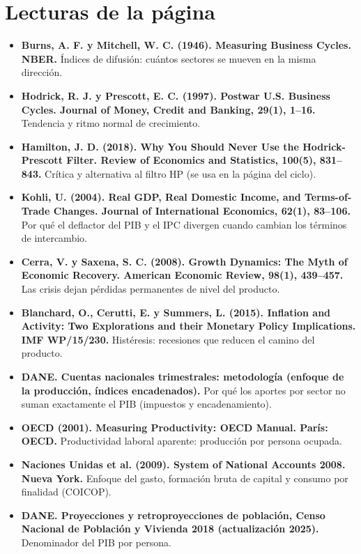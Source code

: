\section*{Lecturas de la página}
\begin{itemize}\small
\item \textbf{Burns, A. F. y Mitchell, W. C. (1946). Measuring Business Cycles. NBER.} Índices de difusión: cuántos sectores se mueven en la misma dirección.
\item \textbf{Hodrick, R. J. y Prescott, E. C. (1997). Postwar U.S. Business Cycles. Journal of Money, Credit and Banking, 29(1), 1–16.} Tendencia y ritmo normal de crecimiento.
\item \textbf{Hamilton, J. D. (2018). Why You Should Never Use the Hodrick-Prescott Filter. Review of Economics and Statistics, 100(5), 831–843.} Crítica y alternativa al filtro HP (se usa en la página del ciclo).
\item \textbf{Kohli, U. (2004). Real GDP, Real Domestic Income, and Terms-of-Trade Changes. Journal of International Economics, 62(1), 83–106.} Por qué el deflactor del PIB y el IPC divergen cuando cambian los términos de intercambio.
\item \textbf{Cerra, V. y Saxena, S. C. (2008). Growth Dynamics: The Myth of Economic Recovery. American Economic Review, 98(1), 439–457.} Las crisis dejan pérdidas permanentes de nivel del producto.
\item \textbf{Blanchard, O., Cerutti, E. y Summers, L. (2015). Inflation and Activity: Two Explorations and their Monetary Policy Implications. IMF WP/15/230.} Histéresis: recesiones que reducen el camino del producto.
\item \textbf{DANE. Cuentas nacionales trimestrales: metodología (enfoque de la producción, índices encadenados).} Por qué los aportes por sector no suman exactamente el PIB (impuestos y encadenamiento).
\item \textbf{OECD (2001). Measuring Productivity: OECD Manual. París: OECD.} Productividad laboral aparente: producción por persona ocupada.
\item \textbf{Naciones Unidas et al. (2009). System of National Accounts 2008. Nueva York.} Enfoque del gasto, formación bruta de capital y consumo por finalidad (COICOP).
\item \textbf{DANE. Proyecciones y retroproyecciones de población, Censo Nacional de Población y Vivienda 2018 (actualización 2025).} Denominador del PIB por persona.
\end{itemize}

